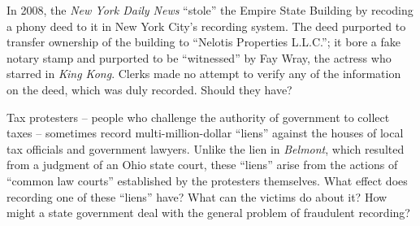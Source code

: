 \item In 2008, the \textit{New York Daily News} ``stole'' the Empire State
Building by recoding a phony deed to it in New York City's recording system.
The deed purported to transfer ownership of the building to ``Nelotis
Properties L.L.C.''; it bore a fake notary stamp and purported to be
``witnessed'' by Fay Wray, the actress who starred in \textit{King Kong}.
Clerks made no attempt to verify any of the information on the deed, which was
duly recorded. Should they have?


\item Tax protesters -- people who challenge the authority of government to
collect taxes -- sometimes record multi-million-dollar ``liens'' against the
houses of local tax officials and government lawyers. Unlike the lien in
\textit{Belmont}, which resulted from a judgment of an Ohio state court, these
``liens'' arise from the actions of ``common law courts'' established by the
protesters themselves. What effect does recording one of these ``liens'' have?
What can the victims do about it? How might a state government deal with the
general problem of fraudulent recording?

